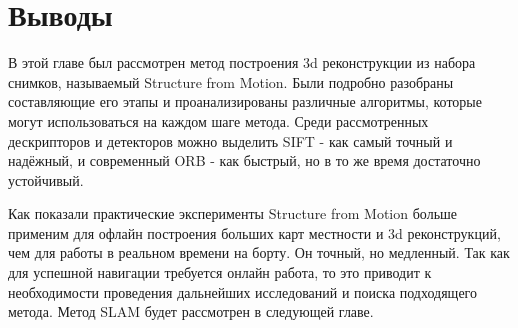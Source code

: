 \section{Выводы}

В этой главе был рассмотрен метод построения 3d реконструкции из набора снимков, называемый Structure from Motion. Были подробно разобраны составляющие его этапы и проанализированы различные алгоритмы, которые могут использоваться на каждом шаге метода. Среди рассмотренных дескрипторов и детекторов можно выделить SIFT - как самый точный и надёжный, и современный ORB - как быстрый, но в то же время достаточно устойчивый.

Как показали практические эксперименты Structure from Motion больше применим для офлайн построения больших карт местности и 3d реконструкций, чем для работы в реальном времени на борту. Он точный, но медленный. Так как для успешной навигации требуется онлайн работа, то это приводит к необходимости проведения дальнейших исследований и поиска подходящего метода. Метод SLAM будет рассмотрен в следующей главе.
